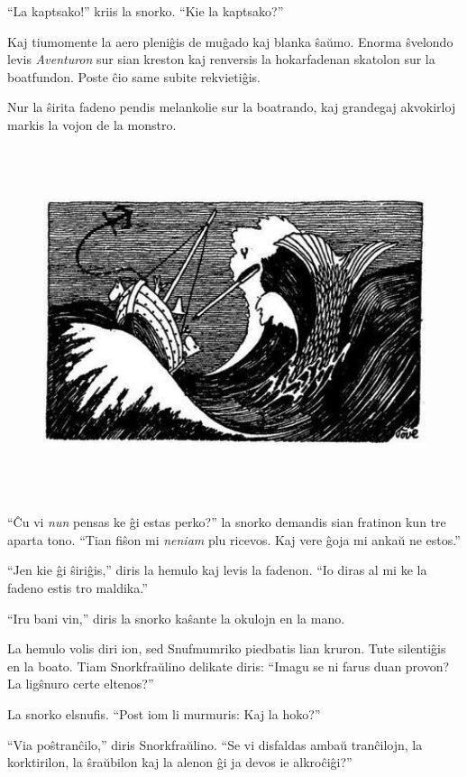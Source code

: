 ``La kaptsako!'' kriis la snorko. ``Kie la kaptsako?''

Kaj tiumomente la aero pleniĝis de muĝado kaj blanka ŝaŭmo. Enorma ŝvelondo levis \emph{Aventuron} sur sian kreston kaj renversis la hokarfadenan skatolon sur la boatfundon. Poste ĉio same subite rekvietiĝis.

Nur la ŝirita fadeno pendis melankolie sur la boatrando, kaj grandegaj akvokirloj markis la vojon de la monstro.

\begin{figure}[htbp]
\centering
\includegraphics[width=449pt,height=291pt]{_25.jpg}
\caption{}
\label{_25}
\end{figure}

``Ĉu vi \emph{nun} pensas ke ĝi estas perko?'' la snorko demandis sian fratinon kun tre aparta tono. ``Tian fiŝon mi \emph{neniam} plu ricevos. Kaj vere ĝoja mi ankaŭ ne estos.''

``Jen kie ĝi ŝiriĝis,'' diris la hemulo kaj levis la fadenon. ``Io diras al mi ke la fadeno estis tro maldika.''

``Iru bani vin,'' diris la snorko kaŝante la okulojn en la mano.

La hemulo volis diri ion, sed Snufmumriko piedbatis lian kruron. Tute silentiĝis en la boato. Tiam Snorkfraŭlino delikate diris: ``Imagu se ni farus duan provon? La ligŝnuro certe eltenos?''

La snorko elsnufis. ``Post iom li murmuris: Kaj la hoko?''

``Via poŝtranĉilo,'' diris Snorkfraŭlino. ``Se vi disfaldas ambaŭ tranĉilojn, la korktirilon, la ŝraŭbilon kaj la alenon ĝi ja devos ie alkroĉiĝi?''

